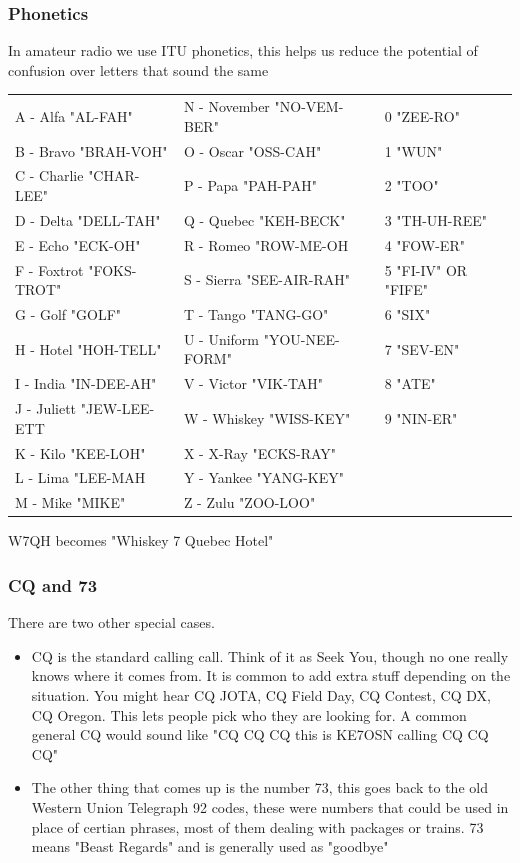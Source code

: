 \documentclass[10pt]{beamer}
\begin{document}
\begin{frame}
\frametitle{Phonetics}
In amateur radio we use ITU phonetics, this helps us reduce the potential of confusion over letters that sound the same
\begin{tabular}{l l l}
\scriptsize A - Alfa "AL-FAH"& \scriptsize  N - November "NO-VEM-BER" & \scriptsize  0 "ZEE-RO"\\
\scriptsize B - Bravo "BRAH-VOH"& \scriptsize  O - Oscar "OSS-CAH" & \scriptsize  1 "WUN"\\
\scriptsize C - Charlie "CHAR-LEE"& \scriptsize  P - Papa "PAH-PAH" & \scriptsize  2 "TOO"\\
\scriptsize D - Delta "DELL-TAH"& \scriptsize  Q - Quebec "KEH-BECK" & \scriptsize  3 "TH-UH-REE"\\
\scriptsize E - Echo "ECK-OH"& \scriptsize  R - Romeo "ROW-ME-OH & \scriptsize  4 "FOW-ER"\\
\scriptsize F - Foxtrot "FOKS-TROT"& \scriptsize  S - Sierra "SEE-AIR-RAH" & \scriptsize  5 "FI-IV" OR "FIFE"\\
\scriptsize G - Golf "GOLF"& \scriptsize  T - Tango "TANG-GO" & \scriptsize  6 "SIX"\\
\scriptsize H - Hotel "HOH-TELL"& \scriptsize  U - Uniform "YOU-NEE-FORM" & \scriptsize  7 "SEV-EN"\\
\scriptsize I - India "IN-DEE-AH"& \scriptsize  V - Victor "VIK-TAH" & \scriptsize  8 "ATE"\\
\scriptsize J - Juliett "JEW-LEE-ETT& \scriptsize  W - Whiskey "WISS-KEY" & \scriptsize  9 "NIN-ER"\\
\scriptsize K - Kilo "KEE-LOH"& \scriptsize  X - X-Ray "ECKS-RAY"\\
\scriptsize L - Lima "LEE-MAH& \scriptsize  Y - Yankee "YANG-KEY"\\
\scriptsize M - Mike "MIKE"& \scriptsize  Z - Zulu "ZOO-LOO"\\
\end{tabular}
W7QH becomes "Whiskey 7 Quebec Hotel" 
\end{frame}

\begin{frame}
\frametitle{CQ and 73}
There are two other special cases.
\begin{itemize}
\item CQ is the standard calling call. Think of it as Seek You, though no one really knows where it comes from. It is common to add extra stuff depending on the situation. You might hear CQ JOTA, CQ Field Day, CQ Contest, CQ DX, CQ Oregon. This lets people pick who they are looking for. A common general CQ would sound like "CQ CQ CQ this is KE7OSN calling CQ CQ CQ"
\item The other thing that comes up is the number 73, this goes back to the old Western Union Telegraph 92 codes, these were numbers that could be used in place of certian phrases, most of them dealing with packages or trains. 73 means "Beast Regards" and is generally used as "goodbye"
\end{itemize}
\end{frame}
\end{document}
